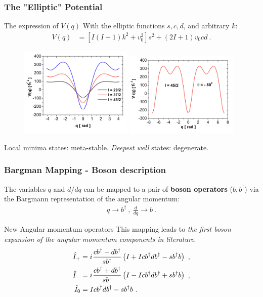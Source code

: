 \documentclass{beamer}
\newcommand{\iu}{{i\mkern1mu}}
\begin{document}
\begin{frame}
  \frametitle{The "Elliptic" Potential}
\begin{block}{The expression of $V(q)$}
  With the elliptic functions $s,c,d$, and arbitrary $k$:
  \begin{align}
    V(q)&=\left[I(I+1)k^2+v_0^2\right]s^2+(2I+1)v_0cd\ .   
  \end{align}
\end{block}
\begin{figure}
  \includegraphics[width=0.48\textwidth]{figures/potential-1.png}
  \includegraphics[width=0.48\textwidth]{figures/potential-2.png}
\end{figure}
Local minima states: meta-stable. \emph{Deepest well} states: degenerate.

\end{frame}


\begin{frame}
  \frametitle{Bargman Mapping - Boson description}

The variables $q$ and $d/dq$ can be mapped to a pair of \textbf{boson operators} ($b,b^\dagger$) via the Bargmann representation of the angular momentum:
\begin{align}
  q\rightarrow b^\dagger\ ,\ \frac{d}{dq}\rightarrow b\ .
\end{align}
\begin{block}{New Angular momentum operators}
  This mapping leads to \emph{the first boson expansion of the angular momentum components in literature}.
  \begin{align}
    \hat{I}_+&=\iu\frac{cb^\dagger-db^\dagger}{sb^\dagger}\left(I+Icb^\dagger db^\dagger-sb^\dagger b\right)\ ,\\
    \hat{I}_-&=\iu\frac{cb^\dagger+db^\dagger}{sb^\dagger}\left(I-Icb^\dagger db^\dagger+sb^\dagger b\right)\ ,\\
    \hat{I}_0&=Icb^\dagger db^\dagger-sb^\dagger b\ .
  \end{align}
  
\end{block}

\end{frame}
\end{document}
